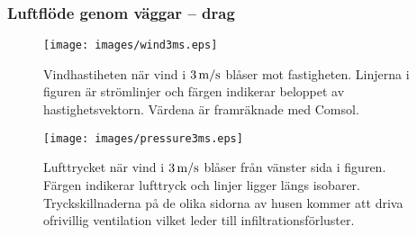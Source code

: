 \subsubsection{Luftflöde genom väggar – drag}

\begin{figure}
\centering
\texttt{[image: images/wind3ms.eps]}
\caption{Vindhastiheten när vind i $\unit[3]{ m/s}$ blåser mot fastigheten. Linjerna
i figuren är strömlinjer och färgen indikerar beloppet av hastighetsvektorn. Värdena är framräknade med Comsol.}
\end{figure}

\begin{figure}
\centering
\texttt{[image: images/pressure3ms.eps]}
\caption{Lufttrycket när vind i $\unit[3]{ m/s}$ blåser från vänster
sida i figuren. Färgen indikerar lufttryck och linjer ligger längs isobarer.
Tryckskillnaderna på de olika sidorna av husen kommer att driva ofrivillig ventilation vilket leder till infiltrationsförluster.}
\end{figure}
